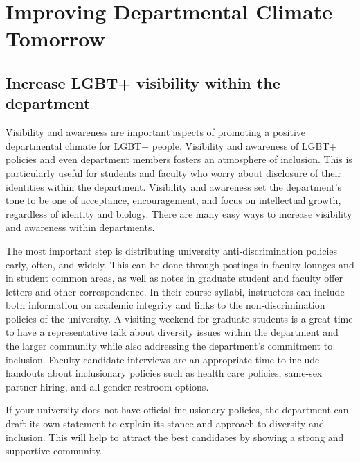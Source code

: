 %

\chapter{Improving Departmental Climate Tomorrow}	%
\label{climate-tomorrow}		%
\normalsize			%


\section {Increase LGBT+ visibility within the department}
\label{visibility}
Visibility and awareness are important aspects of promoting a positive departmental climate for LGBT+ people. Visibility and awareness of LGBT+ policies and even department members fosters an atmosphere of inclusion. This is particularly useful for students and faculty who worry about disclosure of their identities within the department. Visibility and awareness set the department's tone to be one of acceptance, encouragement, and focus on intellectual growth, regardless of identity and biology. There are many easy ways to increase visibility and awareness within departments.

The most important step is distributing university anti-discrimination policies early, often, and widely. This can be done through postings in faculty lounges and in student common areas, as well as notes in graduate student and faculty offer letters and other correspondence. In their course syllabi, instructors can include both information on academic integrity and links to the non-discrimination policies of the university. A visiting weekend for graduate students is a great time to have a representative talk about diversity issues within the department and the larger community while also addressing the department's commitment to inclusion. Faculty candidate interviews are an appropriate time to include handouts about inclusionary policies such as health care policies, same-sex partner hiring, and all-gender restroom options.

If your university does not have official inclusionary policies, the department can draft its own statement to explain its stance and approach to diversity and inclusion. This will help to attract the best candidates by showing a strong and supportive community.


